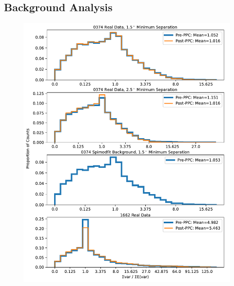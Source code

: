 \documentclass{report}
\begin{document}
\subsection{Background Analysis}
\begin{figure}[h]
  \centering
  \includegraphics[width=\textwidth]{Images/PPC_and_Background_Analysis/background_variance.pdf}
  \caption{}
  \label{}
\end{figure}
\end{document}
